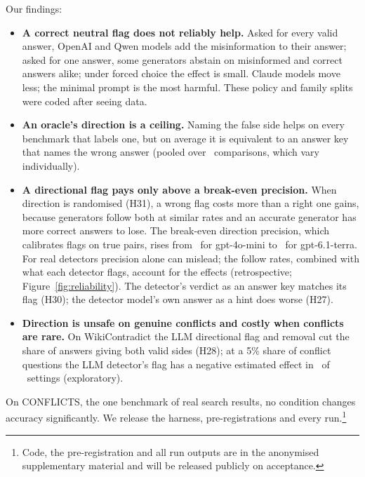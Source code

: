 Our findings:
\begin{itemize}[leftmargin=*,itemsep=1pt,topsep=2pt]
\item \textbf{A correct neutral flag does not reliably help.} Asked for every valid answer, OpenAI and Qwen models add the
misinformation to their answer; asked for one answer, some generators abstain on misinformed and correct answers
alike; under forced choice the effect is small. Claude models move less; the minimal prompt is the most harmful.
These policy and family splits were coded after seeing data.
\item \textbf{An oracle's direction is a ceiling.} Naming the false side helps on every benchmark that labels one, but
on average it is equivalent to an answer key that names the wrong answer (pooled over \PoolTwentyThreeK\
comparisons, which vary individually).
\item \textbf{A directional flag pays only above a break-even precision.} When direction is randomised (H31), a wrong
flag costs more than a right one gains, because generators follow both at similar rates and an accurate generator has
more correct answers to lose. The break-even direction precision, which calibrates flags on true pairs, rises from \beMin\ for gpt-4o-mini to
\beMax\ for gpt-6.1-terra. For real detectors precision alone can mislead; the follow rates, combined with
what each detector flags, account for the effects (retrospective; Figure~\ref{fig:reliability}). The detector's verdict as an answer key matches its flag (H30); the detector model's
own answer as a hint does worse (H27).
\item \textbf{Direction is unsafe on genuine conflicts and costly when conflicts are rare.} On WikiContradict the LLM
directional flag and removal cut the share of answers giving both valid sides (H28); at a 5\% share of conflict
questions the LLM detector's flag has a negative estimated effect in \prevNegFive\ of \prevN\ settings (exploratory).
\end{itemize}
On CONFLICTS, the one benchmark of real search results, no condition changes accuracy significantly. We release the harness, pre-registrations and every run.\footnote{Code, the pre-registration and
all run outputs are in the anonymised supplementary material and will be released publicly on acceptance.}
